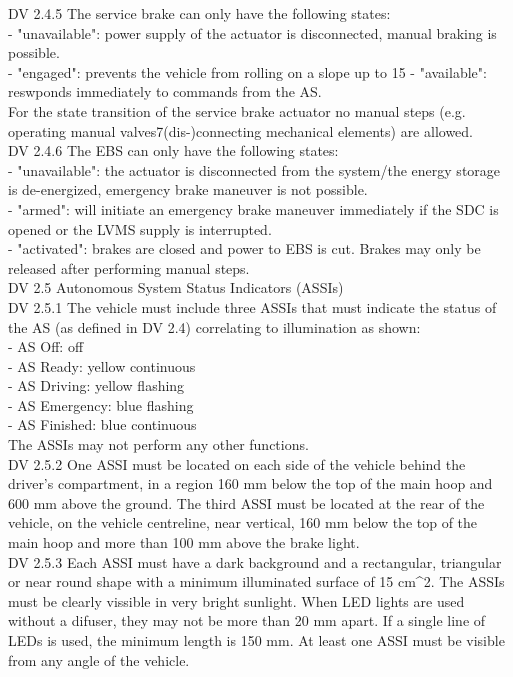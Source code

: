 \documentclass{article}
\begin{document}
DV 2.4.5 The service brake can only have the following states:\\
	- "unavailable": power supply of the actuator is disconnected, manual braking is possible.\\
	- "engaged": prevents the vehicle from rolling on a slope up to 15%
	- "available": reswponds immediately to commands from the AS.\\
	For the state transition of the service brake actuator no manual steps (e.g. operating manual valves7(dis-)connecting mechanical elements) are allowed.\\
	
DV 2.4.6 The EBS can only have the following states:\\
	- "unavailable": the actuator is disconnected from the system/the energy storage is de-energized, emergency brake maneuver is not possible.\\
	- "armed": will initiate an emergency brake maneuver immediately if the SDC is opened or the LVMS supply is interrupted.\\
	- "activated": brakes are closed and power to EBS is cut. Brakes may only be released after performing manual steps.\\

DV 2.5 Autonomous System Status Indicators (ASSIs)\\

DV 2.5.1 The vehicle must include three ASSIs that must indicate the status of the AS (as defined in DV 2.4) correlating to illumination as shown:\\
	- AS Off: off\\
	- AS Ready: yellow continuous\\
	- AS Driving: yellow flashing\\
	- AS Emergency: blue flashing\\
	- AS Finished: blue continuous\\
	The ASSIs may not perform any other functions.\\
	
DV 2.5.2 One ASSI must be located on each side of the vehicle behind the driver's compartment, in a region 160 mm below the top of the main hoop and 600 mm above the ground. The third ASSI must be located at the rear of the vehicle, on the vehicle centreline, near vertical, 160 mm below the top of the main hoop and more than 100 mm above the brake light.\\

DV 2.5.3 Each ASSI must have a dark background and a rectangular, triangular or near round shape with a minimum illuminated surface of 15 cm^2. The ASSIs must be clearly vissible in very bright sunlight. When LED lights are used without a difuser, they may not be more than 20 mm apart. If a single line of LEDs is used, the minimum length is 150 mm. At least one ASSI must be visible from any angle of the vehicle.\\
\end{document}
